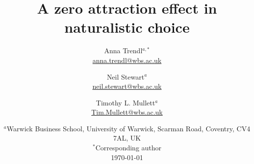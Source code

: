 \documentclass[12pt, a4paper]{article}
\title{}
\author{}
\date{}
\begin{document}
\title{A zero attraction effect in naturalistic choice}

\author{Anna Trendl$^{a,*}$ \\ \href{mailto:anna.trendl@wbs.ac.uk}{anna.trendl@wbs.ac.uk}\\
 \and Neil Stewart$^a$ \\ 
 \href{mailto:neil.stewart@wbs.ac.uk}{neil.stewart@wbs.ac.uk}
 \\ 
 \and Timothy L. Mullett$^a$ \\
 \href{mailto:Tim.Mullett@wbs.ac.uk}{Tim.Mullett@wbs.ac.uk}
 \\}
 
\date{   
    $^a$Warwick Business School, University of Warwick, Scarman Road, Coventry, CV4 7AL, UK\\
    $^*$Corresponding author\\[2ex]%
    \today
}
\end{document}

